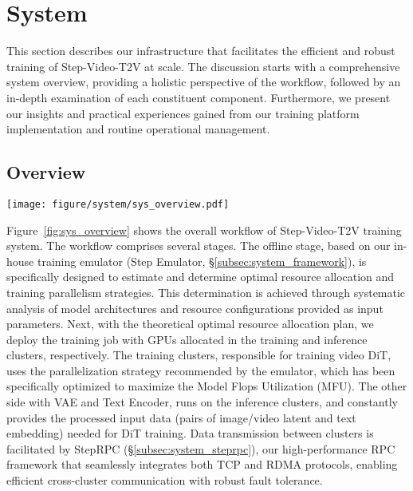 \section{System}

This section describes our infrastructure that facilitates the efficient and robust training of Step-Video-T2V at scale. The discussion starts with a comprehensive system overview, providing a holistic perspective of the workflow, followed by an in-depth examination of each constituent component. Furthermore, we present our insights and practical experiences gained from our training platform implementation and routine operational management.

\subsection{Overview}

\begin{figure*}[t]
    \centering
    \texttt{[image: figure/system/sys\_overview.pdf]}
    \caption{The workflow of Step-Video-T2V training system.}
    \label{fig:sys_overview}
\end{figure*}

Figure~\ref{fig:sys_overview} shows the overall workflow of Step-Video-T2V training system. 
The workflow comprises several stages. The offline stage, based on our in-house training emulator (Step Emulator, \S\ref{subsec:system_framework}), is specifically designed to estimate and determine optimal resource allocation and training parallelism strategies. 
This determination is achieved through systematic analysis of model architectures and resource configurations provided as input parameters. 
Next, with the theoretical optimal resource allocation plan, we deploy the training job with GPUs allocated in the training and inference clusters, respectively. The training clusters, responsible for training video DiT, uses the parallelization strategy recommended by the emulator, which has been specifically optimized to maximize the Model Flops Utilization (MFU). 
The other side with VAE and Text Encoder, runs on the inference clusters, and constantly provides the processed input data (pairs of image/video latent and text embedding) needed for DiT training. Data transmission between clusters is facilitated by StepRPC (\S\ref{subsec:system_steprpc}), our high-performance RPC framework that seamlessly integrates both TCP and RDMA protocols, enabling efficient cross-cluster communication with robust fault tolerance.

